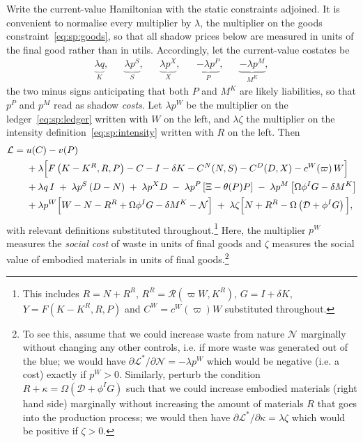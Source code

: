  Write the current-value Hamiltonian with the static constraints
adjoined. It is convenient to normalise every multiplier by $\lambda$, the multiplier on the goods
constraint~\eqref{eq:sp:goods}, so that all shadow prices below are measured in units of the final
good rather than in utils. Accordingly, let the current-value costates be
\begin{align}
\underbrace{\lambda q}_{K},
&&
\underbrace{\lambda p^S}_{S},
&&
\underbrace{\lambda p^X}_{X},
&&
\underbrace{-\lambda p^P}_{P},
&&
\underbrace{-\lambda p^M}_{M^K},
\label{eq:sp:costates-def}
\end{align}
the two minus signs anticipating that both $P$ and $M^K$ are likely liabilities, so that $p^P$ and $p^M$ read as shadow \emph{costs}. Let $\lambda p^W$ be the multiplier on the ledger~\eqref{eq:sp:ledger} written with $W$ on the left, and $\lambda\zeta$ the multiplier on the intensity definition~\eqref{eq:sp:intensity} written with
$R$ on the left. Then
\begin{align}
\mathcal L
={}& u(C)-v(P)
\notag\\
&+\lambda\Big[F\left(K-K^R,R,P\right)-C-I-\delta K-C^N(N,S)-C^D(D,X)-c^W\!\left(\varpi\right)W\Big]
\notag\\
&+\lambda q\,I
\;+\;\lambda p^S\left(D-N\right)
\;+\;\lambda p^X D
\;-\;\lambda p^P\left[\Xi-\theta(P)P\right]
\;-\;\lambda p^M\left[\Omega\phi^IG-\delta M^K\right]
\notag\\
&+\lambda p^W\Big[W-N-R^R+\Omega\phi^IG-\delta M^K-\mathcal N\Big]
\;+\;\lambda \zeta\Big[N+R^R-\Omega\left(\mathcal D+\phi^IG\right)\Big],
\label{eq:sp:lagrangian}
\end{align}
with relevant definitions substituted throughout.\footnote{This includes $R=N+R^R$, $R^R=\mathcal R\left(\varpi W,K^R\right)$, $G=I+\delta K$, $Y=F\left(K-K^R,R,P\right)$
and $C^W=c^W\!\left(\varpi\right)W$ substituted throughout.} Here, the multiplier $p^W$ measures the \textit{social cost} of waste in units of final goods and $\zeta$ measures the social value of embodied materials in units of final goods.\footnote{To see this, assume that we could increase waste from nature $\mathcal{N}$ marginally without changing any other controls, i.e. if more waste was generated out of the blue; we would have $\partial \mathcal L^*/\partial \mathcal N = - \lambda p^W$ which would be negative (i.e. a cost) exactly if $p^W>0$. Similarly, perturb the condition $R + \kappa = \Omega \left(\mathcal{D}+\phi^IG\right)$ such that we could increase embodied materials (right hand side) marginally without increasing the amount of materials $R$ that goes into the production process; we would then have $\partial \mathcal L^*/\partial \kappa = \lambda \zeta$ which would be positive if $\zeta>0$.} 




